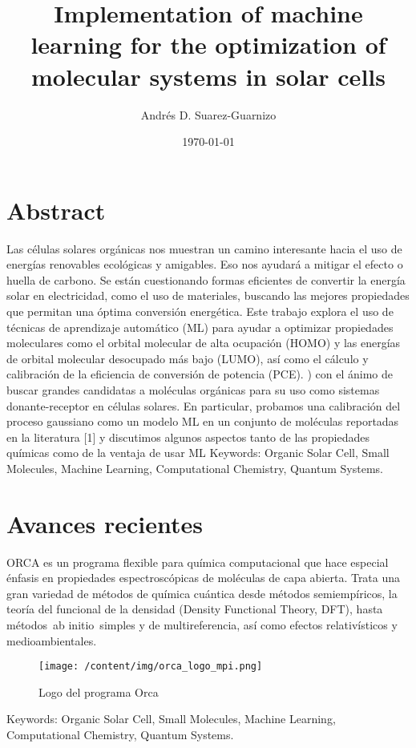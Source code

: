 \documentclass{article}%
\title{Implementation of machine learning for the optimization of molecular systems in solar cells}%
\author{Andrés D. Suarez{-}Guarnizo}%
\date{\today}%
\begin{document}
%
\normalsize%
\maketitle%
\section{Abstract}%
\label{sec:Abstract}%
Las células solares orgánicas nos muestran un camino interesante hacia el uso de energías renovables ecológicas y amigables. Eso nos ayudará a mitigar el efecto o huella de carbono. Se están cuestionando formas eficientes de convertir la energía solar en electricidad, como el uso de materiales, buscando las mejores propiedades que permitan una óptima conversión energética. Este trabajo explora el uso de técnicas de aprendizaje automático (ML) para ayudar a optimizar propiedades moleculares como el orbital molecular de alta ocupación (HOMO) y las energías de orbital molecular desocupado más bajo (LUMO), así como el cálculo y calibración de la eficiencia de conversión de potencia (PCE). ) con el ánimo de buscar grandes candidatas a moléculas orgánicas para su uso como sistemas donante{-}receptor en células solares. En particular, probamos una calibración del proceso gaussiano como un modelo ML en un conjunto de moléculas reportadas en la literatura {[}1{]} y discutimos algunos aspectos tanto de las propiedades químicas como de la ventaja de usar ML%
Keywords: Organic Solar Cell, Small Molecules, Machine Learning, Computational Chemistry, Quantum Systems.

%
\section{Avances recientes}%
\label{sec:Avancesrecientes}%
ORCA es un programa flexible para química computacional que hace especial énfasis en propiedades espectroscópicas de moléculas de capa abierta. Trata una gran variedad de métodos de química cuántica desde métodos semiempíricos, la teoría del funcional de la densidad (Density Functional Theory, DFT), hasta métodos~ab initio~simples y de multireferencia, así como efectos relativísticos y medioambientales.%


\begin{figure}[h!]%
\centering%
\texttt{[image: /content/img/orca\_logo\_mpi.png]}%
\caption{Logo del programa Orca}%
\end{figure}

%
Keywords: Organic Solar Cell, Small Molecules, Machine Learning, Computational Chemistry, Quantum Systems.

%
\end{document}
